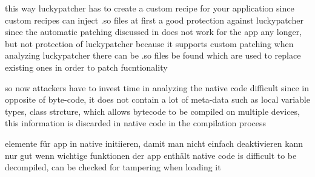 this way luckypatcher has to create a custom recipe for your application since custom recipes can inject .so files
at first a good protection against luckypatcher since the automatic patching discussed in does not work for the app any longer, but not protection of luckypatcher because it supports custom patching
when analyzing luckypatcher there can be .so files be found which are used to replace existing ones in order to patch fucntionality

so now attackers have to invest time in analyzing the native code
difficult since in opposite of byte-code, it does not contain a lot of meta-data such as local variable types, class strcture, which allows bytecode to be compiled on multiple devices, this information is discarded in native code in the compilation process

elemente für app in native initiieren, damit man nicht einfach deaktivieren kann
nur gut wenn wichtige funktionen der app enthält
native code is difficult to be decompiled, can be checked for tampering when loading it
